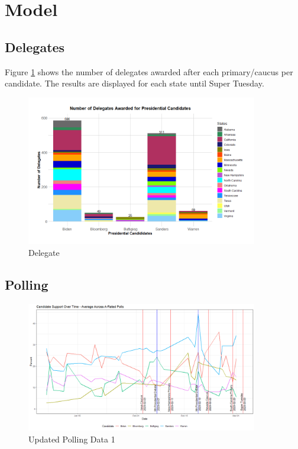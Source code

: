\section{Model}\label{model}

\subsection{Delegates}

Figure \ref{Delegate} shows the number of delegates awarded after each primary/caucus per candidate. The results are displayed for each state until Super Tuesday.

\begin{figure}[H]
    \centering
    \includegraphics[width=0.9\textwidth]{figures/Delegate.png}
    \caption{Delegate}
    \label{Delegate}
\end{figure}

\subsection{Polling}

\begin{figure}[H]
    \centering
    \includegraphics[width=0.9\textwidth]{figures/long-A-rated-polls.png}
    \caption{Updated Polling Data 1 }
    \label{Updated-Polling-Data-1}
\end{figure}

